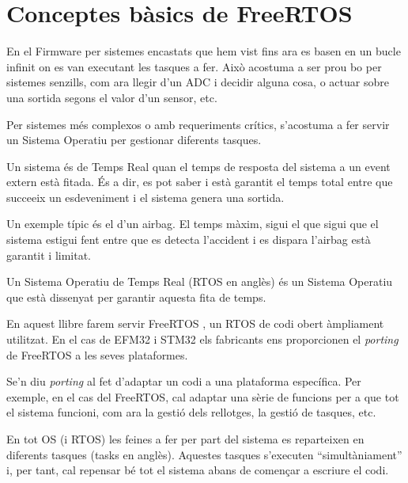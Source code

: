 \chapter{Conceptes bàsics de FreeRTOS}
\label{ch:FreeRTOS}

En el Firmware per sistemes encastats que hem vist fins ara es basen en un bucle infinit on es van executant les tasques a fer. Això acostuma a ser prou bo per sistemes senzills, com ara llegir d'un \gls{ADC} i decidir alguna cosa, o actuar sobre una sortida segons el valor d'un sensor, etc.

Per sistemes més complexos o amb requeriments crítics, s'acostuma a fer servir un Sistema Operatiu per gestionar diferents tasques.
\begin{remark}

Un sistema és de Temps Real quan el temps de resposta del sistema a un event extern està fitada. És a dir, es pot saber i està garantit el temps total entre que
succeeix un esdeveniment i el sistema genera una sortida.

Un exemple típic és el d'un airbag. El temps màxim, sigui el que sigui que el sistema estigui fent entre que es detecta l'accident i es dispara l'airbag està garantit i limitat.

Un Sistema Operatiu de Temps Real (RTOS en anglès) és un Sistema Operatiu que està dissenyat per garantir aquesta fita de temps.
\end{remark}
En aquest llibre farem servir \gls{FreeRTOS} \cite{freertos}, un \gls{RTOS} de codi obert àmpliament utilitzat. En el cas de EFM32 i STM32 els fabricants ens proporcionen el {\em porting} de FreeRTOS a les seves plataformes.

\begin{remark}
 Se'n diu {\em porting} al fet d'adaptar un codi a una plataforma específica. Per exemple, en el cas del FreeRTOS, cal adaptar una sèrie de funcions per a que tot el sistema funcioni, com ara la gestió dels rellotges, la gestió de tasques, etc.
\end{remark}


En tot \gls{OS} (i \gls{RTOS}) les feines a fer per part del sistema es reparteixen en diferents tasques (\glspl{task} en anglès). Aquestes tasques s'executen “simultàniament” i, per tant, cal repensar bé tot el sistema abans de començar a escriure el codi.

